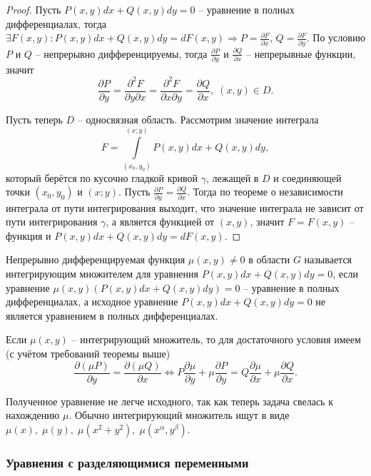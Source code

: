 \begin{proof}
    Пусть $P(x, y)dx + Q(x, y)dy = 0$ -- уравнение в полных дифференциалах, тогда $\exists F(x, y): P(x, y)dx + Q(x, y)dy = dF(x, y) \Rightarrow P = \frac{\partial F}{\partial x}$, $Q = \frac{\partial F}{\partial y}$. По условию $P$ и $Q$ -- непрерывно дифференцируемы, тогда $\frac{\partial P}{\partial y}$ и $\frac{\partial Q}{\partial x}$ -- непрерывные функции, значит 
    \begin{equation}
        \frac{\partial P}{\partial y} = \frac{\partial^2 F}{\partial y \partial x} = \frac{\partial^2 F}{\partial x \partial y} = \frac{\partial Q}{\partial x}, \; (x, y) \in D.
    \end{equation}

    Пусть теперь $D$ -- односвязная область. Рассмотрим значение интеграла
    \[ F = \int\limits^{(x; y)}_{(x_0, y_0)} P(x, y) dx + Q(x, y) dy, \]
    который берётся по кусочно гладкой кривой $\gamma$, лежащей в $D$ и соединяющей точки $(x_0, y_0)$ и $(x; y)$. Пусть $\frac{\partial P}{\partial y} = \frac{\partial Q}{\partial x}$. Тогда по теореме о независимости интеграла от пути интегрирования выходит, что значение интеграла не зависит от пути интегрирования $\gamma$, а является функцией от $(x, y)$, значит $F = F(x, y)$ -- функция и $P(x, y)dx + Q(x, y)dy = dF(x, y)$.
\end{proof}

\begin{definition}
    Непрерывно дифференцируемая функция $\mu(x, y) \neq 0$ в области $G$ называется интегрирующим множителем для уравнения $P(x, y) dx + Q(x, y) dy = 0$, если уравнение $\mu(x, y) (P(x, y) dx + Q(x, y) dy) = 0$ -- уравнение в полных дифференциалах, а исходное уравнение $P(x, y) dx + Q(x, y) dy = 0$ не является уравнением в полных дифференциалах.
\end{definition}

Если $\mu(x, y)$ -- интегрирующий множитель, то для достаточного условия имеем (с учётом требований теоремы выше)
\[ \frac{\partial (\mu P)}{\partial y} = \frac{\partial (\mu Q)}{\partial x} \Leftrightarrow P \frac{\partial \mu}{\partial y} + \mu \frac{\partial P}{\partial y} = Q \frac{\partial \mu}{\partial x} + \mu \frac{\partial Q}{\partial x}. \]

Полученное уравнение не легче исходного, так как теперь задача свелась к нахождению $\mu$. Обычно интегрирующий множитель ищут в виде $\mu(x), \; \mu(y), \; \mu(x^2 + y^2), \; \mu (x^{\alpha}, y^ {\beta})$.

\subsubsection{Уравнения с разделяющимися переменными}

